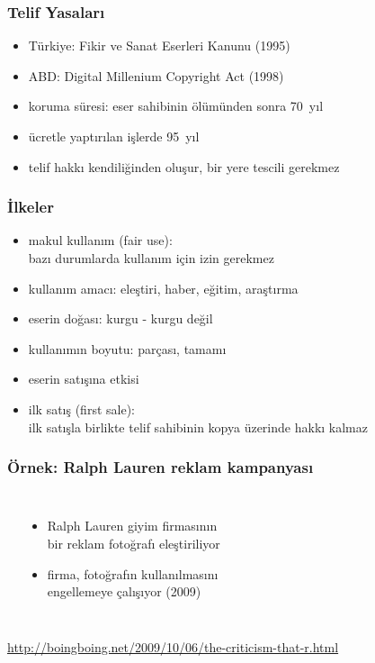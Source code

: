 \documentclass[dvipsnames]{beamer}
\theoremstyle{plain}
\begin{document}
\begin{frame}
  \frametitle{Telif Yasaları}

  \begin{itemize}
    \item Türkiye: Fikir ve Sanat Eserleri Kanunu (1995)
    \item ABD: Digital Millenium Copyright Act (1998)

    \medskip
    \item koruma süresi: eser sahibinin ölümünden sonra 70~yıl
    \item ücretle yaptırılan işlerde 95~yıl

    \pause
    \medskip
    \item telif hakkı kendiliğinden oluşur, bir yere tescili gerekmez
  \end{itemize}
\end{frame}
%

\begin{frame}
  \frametitle{İlkeler}

  \begin{itemize}
    \item \alert{makul kullanım} (fair use):\\
      bazı durumlarda kullanım için izin gerekmez
    \item kullanım amacı: eleştiri, haber, eğitim, araştırma
    \item eserin doğası: kurgu - kurgu değil
    \item kullanımın boyutu: parçası, tamamı
    \item eserin satışına etkisi

    \pause
    \bigskip
    \item \alert{ilk satış} (first sale):\\
      ilk satışla birlikte telif sahibinin kopya üzerinde hakkı kalmaz
  \end{itemize}
\end{frame}

\begin{frame}
  \frametitle{Örnek: Ralph Lauren reklam kampanyası}

  \begin{columns}
    \begin{center}
    \end{center}

    \begin{itemize}
      \item Ralph Lauren giyim firmasının\\
        bir reklam fotoğrafı eleştiriliyor
      \item firma, fotoğrafın kullanılmasını\\
        engellemeye çalışıyor (2009)
    \end{itemize}
  \end{columns}

  \medskip
  \tiny{\url{http://boingboing.net/2009/10/06/the-criticism-that-r.html}}\\
\end{frame}
\end{document}

